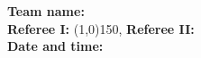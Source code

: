 \begin{flushleft}
\textbf{Team name:} \hrulefill \\ 
\vspace{0.4cm}
\textbf{Referee I:} \line(1,0){150}, \textbf{Referee II:} \hrulefill \\
\vspace{0.4cm}
\textbf{Date and time:} \hrulefill
\end{flushleft}
